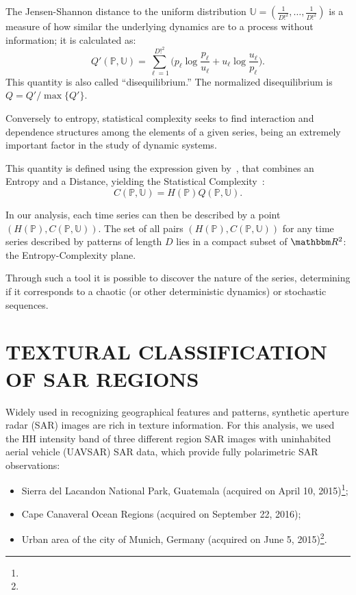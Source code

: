 \documentclass{isprs}
\begin{document}
The Jensen-Shannon distance to the uniform distribution $\mathbb{U} = (\frac{1}{D!^2}, \dots, \frac{1}{D!^2})$ is a measure of how similar the underlying dynamics are to a process without information; it is calculated as:
\begin{equation}
Q'(\mathbb{P}, \mathbb{U}) = \sum_{\ell=1}^{D!^2} \Big(p_\ell \log\frac{p_\ell}{u_\ell} +
u_\ell \log\frac{u_\ell}{p_\ell}
\Big).
\end{equation}
This quantity is also called ``disequilibrium.''
The normalized disequilibrium is $ Q=Q'/\max\{Q'\}$.

Conversely to entropy, statistical complexity seeks to find interaction and dependence structures among the elements of a given series, being an extremely important factor in the study of dynamic systems.

This quantity is defined using the expression given by~\cite{Lopez1995statistical}, 
that combines an Entropy and a Distance, yielding the Statistical Complexity~\cite{Feldman2008information,Feldman1998Statistical}:
\begin{equation}
C(\mathbb{P}, \mathbb{U}) = H(\mathbb{P}) Q(\mathbb{P}, \mathbb{U}).
\end{equation}

In our analysis, each time series can then be described by a point $(H(\mathbb{P}), C(\mathbb{P}, \mathbb{U}))$.
The set of all pairs $(H(\mathbb{P}), C(\mathbb{P}, \mathbb{U}))$ for any time series described by patterns of length $D$ lies in a compact subset of $\mathbbm R^2$: the Entropy-Complexity plane. 

Through such a tool it is possible to discover the nature of the series, determining if it corresponds to a chaotic (or other deterministic dynamics) or stochastic sequences.

\section{TEXTURAL CLASSIFICATION OF SAR REGIONS}\label{SAR}

Widely used in recognizing geographical features and patterns, synthetic aperture radar (SAR) images are rich in texture information.
For this analysis, we used the HH intensity band of three different region SAR images with uninhabited aerial vehicle (UAVSAR) SAR data, which provide fully polarimetric SAR observations:
\begin{itemize}
	\item Sierra del Lacandon National Park, Guatemala (acquired on April 10, 2015)\footnote{};
	\item Cape Canaveral Ocean Regions (acquired on September 22, 2016);
	\item Urban area of the city of Munich, Germany (acquired on June 5, 2015)\footnote{}.
\end{itemize}
\end{document}
